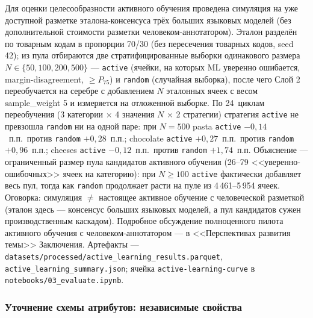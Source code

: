 Для оценки целесообразности активного обучения проведена симуляция на уже доступной разметке эталона-консенсуса трёх больших языковых моделей (без дополнительной стоимости разметки человеком-аннотатором). Эталон разделён по товарным кодам в пропорции 70/30 (без пересечения товарных кодов, seed 42); из пула отбираются две стратифицированные выборки одинакового размера $N \in \{50, 100, 200, 500\}$ --- \texttt{active} (ячейки, на которых ML уверенно ошибается, margin-disagreement, $\ge P_{75}$) и \texttt{random} (случайная выборка), после чего Слой 2 переобучается на серебре с добавлением $N$ эталонных ячеек с весом sample\_weight 5 и измеряется на отложенной выборке. По 24~циклам переобучения (3 категории $\times$ 4 значения $N$ $\times$ 2 стратегии) стратегия \texttt{active} не превзошла \texttt{random} ни на одной паре: при $N=500$ pasta \texttt{active} $-0{,}14$~п.п.\ против \texttt{random} $+0{,}28$~п.п.; chocolate \texttt{active} $+0{,}27$~п.п.\ против \texttt{random} $+0{,}96$~п.п.; cheeses \texttt{active} $-0{,}12$~п.п.\ против \texttt{random} $+1{,}74$~п.п. Объяснение --- ограниченный размер пула кандидатов активного обучения (26--79 <<уверенно-ошибочных>> ячеек на категорию): при $N \ge 100$ \texttt{active} фактически добавляет весь пул, тогда как \texttt{random} продолжает расти на пуле из 4\,461--5\,954 ячеек. Оговорка: симуляция $\neq$ настоящее активное обучение с человеческой разметкой (эталон здесь --- консенсус больших языковых моделей, а пул кандидатов сужен производственным каскадом). Подробное обсуждение полноценного пилота активного обучения с человеком-аннотатором --- в <<Перспективах развития темы>> Заключения. Артефакты --- \texttt{datasets/processed/active\_learning\_results.parquet}, \texttt{active\_learning\_summary.json}; ячейка \texttt{active-learning-curve} в \texttt{notebooks/03\_evaluate.ipynb}.

\subsubsection{Уточнение схемы атрибутов: независимые свойства}
\label{subsec:schema_refinement}

